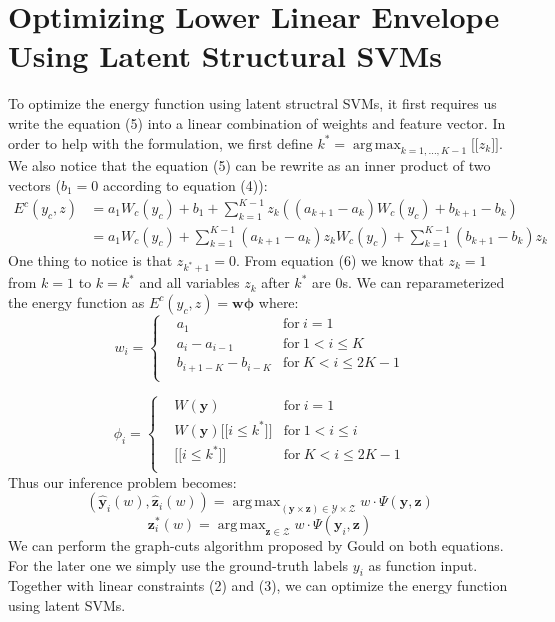 \documentclass{article}
\DeclareMathOperator*{\argmax}{arg\,max}
\begin{document}
		\section{Optimizing Lower Linear Envelope Using Latent Structural SVMs}
		To optimize the energy function using latent structral SVMs, it first requires us write the equation (5) into a linear combination of weights and feature vector. In order to help with the formulation, we first define $k^* = \argmax_{k=1,\dots,K-1} \big[\big[z_{k}\big]\big]$. We also notice that the equation (5) can be rewrite as an inner product of two vectors ($b_1=0$ according to equation  (4)):
		\begin{align*}
		E^c(y_c,z)&=a_1W_c(y_c)+b_1+\sum_{k=1}^{K-1}z_k((a_{k+1}-a_k)W_c(y_c)+b_{k+1}-b_k)\\
		&=a_1W_c(y_c)+\sum_{k=1}^{K-1}(a_{k+1}-a_k)z_kW_c(y_c)+\sum_{k=1}^{K-1}(b_{k+1}-b_k)z_k
		\end{align*}
		One thing to notice is that $z_{k^*+1}=0$. From equation (6) we know that $z_k = 1$ from $k=1$ to $k=k^*$ and all variables $z_k$ after $k^*$ are $0$s. We can reparameterized the energy function as $E^c(y_c,z)=\mathbf{w}\mathbf{\phi}$ where:
		\begin{equation}
			w_i = \left\{
			\begin{aligned}
				& a_1	& \text{for} \ i=1\\
				& a_i-a_{i-1} & \text{for}\ 1< i \leq K\\
				& b_{i+1-K}-b_{i-K} & \text{for} \ K<i\le2K-1\\
			\end{aligned}
			\right.
		\end{equation}
		
		\begin{equation}
		\phi_i = \left\{
		\begin{aligned}
		& W(\mathbf{y}) 	& \text{for} \ i=1\\
		& W(\mathbf{y})\bigg[\bigg[i\le k^*\bigg]\bigg] & \text{for}\ 1<i\le i\\
		& \bigg[\bigg[ i\le k^*\bigg]\bigg]  & \text{for} \ K<i\le2K-1\\
		\end{aligned}
		\right.
		\end{equation}
		Thus our inference problem becomes:
		$$
		(\mathbf{\hat{y}}_i(w),\mathbf{\hat{z}}_i(w))=\argmax_{(\mathbf{y} \times \mathbf{z}) \in \mathcal{Y} \times \mathcal{Z}} w\cdot\Psi(\mathbf{y},\mathbf{z})
		$$
		$$
		\mathbf{z}^*_i(w) = \argmax_{\mathbf{z} \in \mathcal{Z}} w \cdot \Psi(\mathbf{y}_i,\mathbf{z})
		$$
		We can perform the graph-cuts algorithm proposed by Gould\cite{gouldlearning} on both equations. For the later one we simply use the ground-truth labels $y_i$ as function input. Together with linear constraints (2) and (3), we can optimize the energy function using latent SVMs.

	\renewcommand\refname{Bibliography}
	
	
\end{document}
